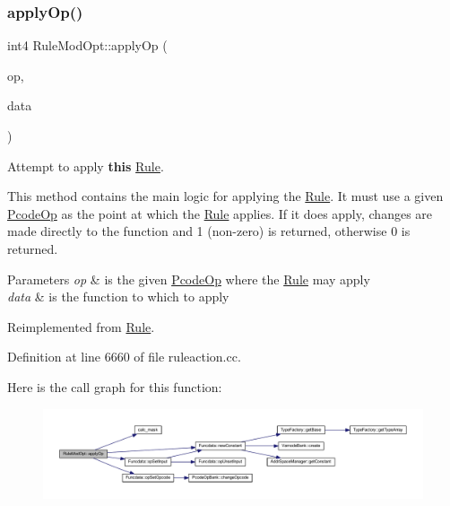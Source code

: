 \subsubsection{\texorpdfstring{applyOp()}{applyOp()}}
{\footnotesize\ttfamily int4 Rule\+Mod\+Opt\+::apply\+Op (\begin{DoxyParamCaption}\item[{\mbox{\hyperlink{class_pcode_op}{Pcode\+Op}} $\ast$}]{op,  }\item[{\mbox{\hyperlink{class_funcdata}{Funcdata}} \&}]{data }\end{DoxyParamCaption})\hspace{0.3cm}{\ttfamily [virtual]}}



Attempt to apply {\bfseries{this}} \mbox{\hyperlink{class_rule}{Rule}}. 

This method contains the main logic for applying the \mbox{\hyperlink{class_rule}{Rule}}. It must use a given \mbox{\hyperlink{class_pcode_op}{Pcode\+Op}} as the point at which the \mbox{\hyperlink{class_rule}{Rule}} applies. If it does apply, changes are made directly to the function and 1 (non-\/zero) is returned, otherwise 0 is returned. 
\begin{DoxyParams}{Parameters}
{\em op} & is the given \mbox{\hyperlink{class_pcode_op}{Pcode\+Op}} where the \mbox{\hyperlink{class_rule}{Rule}} may apply \\
\hline
{\em data} & is the function to which to apply \\
\hline
\end{DoxyParams}


Reimplemented from \mbox{\hyperlink{class_rule_a4e3e61f066670175009f60fb9dc60848}{Rule}}.



Definition at line 6660 of file ruleaction.\+cc.

Here is the call graph for this function\+:
\nopagebreak
\begin{figure}[H]
\begin{center}
\leavevmode
\includegraphics[width=350pt]{class_rule_mod_opt_ab868b1ba7b5ba982da1c316637d72c1e_cgraph}
\end{center}
\end{figure}
\mbox{\label{class_rule_mod_opt_a45d5b1d80fa9bc5e5cd9dd4b134aa09b}} 
